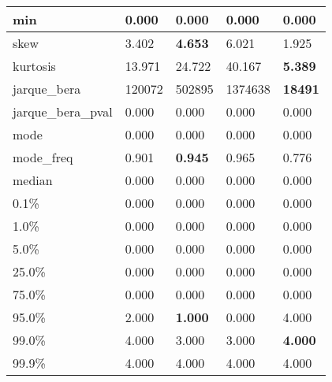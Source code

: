 \begin{table}[H]
\begin{tabular}{|l|m{10em}|m{10em}|m{10em}|m{10em}|}
\hline min & 0.000 & 0.000 & 0.000 & 0.000 \\
\hline skew & 3.402 & \bfseries 4.653 & \cellcolor[rgb]{0.9, 0.54, 0.52} 6.021 & 1.925 \\
\hline kurtosis & 13.971 & 24.722 & \cellcolor[rgb]{0.9, 0.54, 0.52} 40.167 & \bfseries 5.389 \\
\hline jarque\_bera & 120072 & 502895 & \cellcolor[rgb]{0.9, 0.54, 0.52} 1374638 & \bfseries 18491 \\
\hline jarque\_bera\_pval & 0.000 & 0.000 & 0.000 & 0.000 \\
\hline mode & 0.000 & 0.000 & 0.000 & 0.000 \\
\hline mode\_freq & 0.901 & \bfseries 0.945 & 0.965 & \cellcolor[rgb]{0.9, 0.54, 0.52} 0.776 \\
\hline median & 0.000 & 0.000 & 0.000 & 0.000 \\
\hline 0.1\% & 0.000 & 0.000 & 0.000 & 0.000 \\
\hline 1.0\% & 0.000 & 0.000 & 0.000 & 0.000 \\
\hline 5.0\% & 0.000 & 0.000 & 0.000 & 0.000 \\
\hline 25.0\% & 0.000 & 0.000 & 0.000 & 0.000 \\
\hline 75.0\% & 0.000 & 0.000 & 0.000 & 0.000 \\
\hline 95.0\% & 2.000 & \bfseries 1.000 & \cellcolor[rgb]{0.9, 0.54, 0.52} 0.000 & \cellcolor[rgb]{0.9, 0.54, 0.52} 4.000 \\
\hline 99.0\% & 4.000 & \cellcolor[rgb]{0.9, 0.54, 0.52} 3.000 & \cellcolor[rgb]{0.9, 0.54, 0.52} 3.000 & \bfseries 4.000 \\
\hline 99.9\% & 4.000 & 4.000 & 4.000 & 4.000 \\
\hline
\end{tabular}
\end{table}
